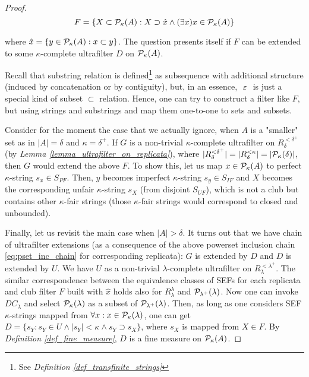 \begin{proof}
    \[ F = \{ X \subset \mathcal{P}_{\kappa}(A) : X \supset \hat{x} \land (\exists x) x \in \mathcal{P}_{\kappa}(A) \} \]

    where $\hat{x} = \{ y \in \mathcal{P}_{\kappa}(A) : x \subset y \}$. The question presents itself if $F$ can be extended to some $\kappa$-complete ultrafilter $D$ on $\mathcal{P}_\kappa(A)$.

    Recall that substring relation is defined\footnote{See \textit{Definition \ref{def_transfinite_strings}}} as subsequence with additional structure (induced by concatenation or by contiguity), but, in an essence, $\ \varepsilon\ $ is just a special kind of subset $\subset$ relation. Hence, one can try to construct a filter like $F$, but using strings and substrings and map them one-to-one to sets and subsets.

    Consider for the moment the case that we actually ignore, when $A$ is a "smaller" set as in $|A| = \delta$ and $\kappa = \delta^+$. If $G$ is a non-trivial $\kappa$-complete ultrafilter on $R^{<\delta^+}_\delta$ (by \textit{Lemma \ref{lemma_ultrafilter_on_replicata}}), where $|R^{<\delta^+}_\delta| = |R^{<\kappa}_\delta| = |\mathcal{P}_{\kappa}(\delta)|$, then $G$ would extend the above $F$. To show this, let us map $x \in \mathcal{P}_{\kappa}(A)$ to perfect $\kappa$-string $s_x \in S_{PF}$. Then, $y$ becomes imperfect $\kappa$-string $s_y \in S_{IF}$ and $X$ becomes the corresponding unfair $\kappa$-string $s_X$ (from disjoint $S_{UF}$), which is not a club but contains other $\kappa$-fair strings (those $\kappa$-fair strings would correspond to closed and unbounded).

    Finally, let us revisit the main case when $|A| > \delta$. It turns out that we have chain of ultrafilter extensions (as a consequence of the above powerset inclusion chain \eqref{eq:pset_inc_chain} for corresponding replicata): $G$ is extended by $D$ and $D$ is extended by $U$. We have $U$ as a non-trivial $\lambda$-complete ultrafilter on $R^{<\lambda^+}_\lambda$. The similar correspondence between the equivalence classes of SEFs for each replicata and club filter $F$ built with $\hat{x}$ holds also for $R^{\lambda}_{\lambda}$ and $\mathcal{P}_{\lambda^+}(\lambda)$. Now one can invoke $DC_\lambda$ and select $\mathcal{P}_{\kappa}(\lambda)$ as a subset of $\mathcal{P}_{\lambda^+}(\lambda)$. Then, as long as one considers SEF $\kappa$-strings mapped from $\forall x: x \in \mathcal{P}_{\kappa}(\lambda)$, one can get $D = \{s_Y : s_Y \in U \land |s_Y| < \kappa \land s_Y \supset s_X\}$, where $s_X$ is mapped from $X \in F$. By \textit{Definition \ref{def_fine_measure}}, $D$ is a fine measure on $\mathcal{P}_\kappa(A)$.
\end{proof}

